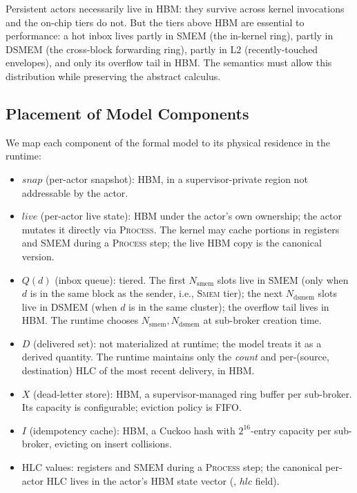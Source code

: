 Persistent actors necessarily live in HBM: they survive across
kernel invocations and the on-chip tiers do not.  But the tiers
above HBM are essential to performance: a hot inbox lives partly in
SMEM (the in-kernel ring), partly in DSMEM (the cross-block
forwarding ring), partly in L2 (recently-touched envelopes), and
only its overflow tail in HBM.  The semantics must allow this
distribution while preserving the abstract calculus.

\subsection{Placement of Model Components}
\label{sec:memory:placement}

We map each component of the formal model to its physical residence
in the runtime:

\begin{itemize}
\item \(\mathit{snap}\) (per-actor snapshot): HBM, in a
supervisor-private region not addressable by the actor.

\item \(\mathit{live}\) (per-actor live state): HBM under the actor's
own ownership; the actor mutates it directly via \textsc{Process}.
The kernel may cache portions in registers and SMEM during a
\textsc{Process} step; the live HBM copy is the canonical version.

\item \(Q(d)\) (inbox queue): tiered. The first \(N_{\mathrm{smem}}\)
slots live in SMEM (only when \(d\) is in the same block as the
sender, i.e., \textsc{Smem} tier); the next \(N_{\mathrm{dsmem}}\)
slots live in DSMEM (when \(d\) is in the same cluster); the
overflow tail lives in HBM.  The runtime chooses
\(N_{\mathrm{smem}}, N_{\mathrm{dsmem}}\) at sub-broker creation
time.

\item \(D\) (delivered set): not materialized at runtime; the model
treats it as a derived quantity. The runtime maintains only the
\emph{count} and per-(source,\,destination) HLC of the most recent
delivery, in HBM.

\item \(X\) (dead-letter store): HBM, a supervisor-managed ring
buffer per sub-broker. Its capacity is configurable; eviction policy
is FIFO.

\item \(I\) (idempotency cache): HBM, a Cuckoo hash with
\(2^{16}\)-entry capacity per sub-broker, evicting on insert collisions.

\item HLC values: registers and SMEM during a \textsc{Process} step;
the canonical per-actor HLC lives in the actor's HBM state vector
(, \(\mathit{hlc}\) field).
\end{itemize}

